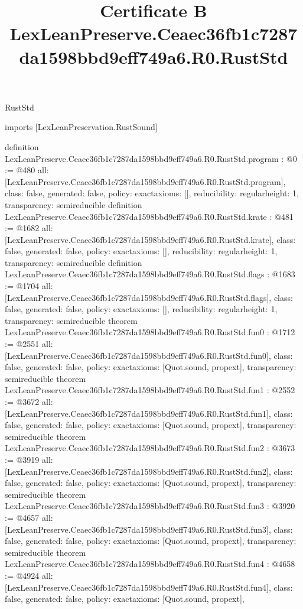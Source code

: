 \begin{lexlean}{RustStd}
\title{Certificate B LexLeanPreserve.Ceaec36fb1c7287da1598bbd9eff749a6.R0.RustStd}
\begin{coremodule}
imports [LexLeanPreservation.RustSound]

definition LexLeanPreserve.Ceaec36fb1c7287da1598bbd9eff749a6.R0.RustStd.program : @0 := @480 {
  all: [LexLeanPreserve.Ceaec36fb1c7287da1598bbd9eff749a6.R0.RustStd.program],
  class: false,
  generated: false,
  policy: exact{axioms: []},
  reducibility: regular{height: 1},
  transparency: semireducible
}
definition LexLeanPreserve.Ceaec36fb1c7287da1598bbd9eff749a6.R0.RustStd.krate : @481 := @1682 {
  all: [LexLeanPreserve.Ceaec36fb1c7287da1598bbd9eff749a6.R0.RustStd.krate],
  class: false,
  generated: false,
  policy: exact{axioms: []},
  reducibility: regular{height: 1},
  transparency: semireducible
}
definition LexLeanPreserve.Ceaec36fb1c7287da1598bbd9eff749a6.R0.RustStd.flags : @1683 := @1704 {
  all: [LexLeanPreserve.Ceaec36fb1c7287da1598bbd9eff749a6.R0.RustStd.flags],
  class: false,
  generated: false,
  policy: exact{axioms: []},
  reducibility: regular{height: 1},
  transparency: semireducible
}
theorem LexLeanPreserve.Ceaec36fb1c7287da1598bbd9eff749a6.R0.RustStd.fun0 : @1712 := @2551 {
  all: [LexLeanPreserve.Ceaec36fb1c7287da1598bbd9eff749a6.R0.RustStd.fun0],
  class: false,
  generated: false,
  policy: exact{axioms: [Quot.sound, propext]},
  transparency: semireducible
}
theorem LexLeanPreserve.Ceaec36fb1c7287da1598bbd9eff749a6.R0.RustStd.fun1 : @2552 := @3672 {
  all: [LexLeanPreserve.Ceaec36fb1c7287da1598bbd9eff749a6.R0.RustStd.fun1],
  class: false,
  generated: false,
  policy: exact{axioms: [Quot.sound, propext]},
  transparency: semireducible
}
theorem LexLeanPreserve.Ceaec36fb1c7287da1598bbd9eff749a6.R0.RustStd.fun2 : @3673 := @3919 {
  all: [LexLeanPreserve.Ceaec36fb1c7287da1598bbd9eff749a6.R0.RustStd.fun2],
  class: false,
  generated: false,
  policy: exact{axioms: [Quot.sound, propext]},
  transparency: semireducible
}
theorem LexLeanPreserve.Ceaec36fb1c7287da1598bbd9eff749a6.R0.RustStd.fun3 : @3920 := @4657 {
  all: [LexLeanPreserve.Ceaec36fb1c7287da1598bbd9eff749a6.R0.RustStd.fun3],
  class: false,
  generated: false,
  policy: exact{axioms: [Quot.sound, propext]},
  transparency: semireducible
}
theorem LexLeanPreserve.Ceaec36fb1c7287da1598bbd9eff749a6.R0.RustStd.fun4 : @4658 := @4924 {
  all: [LexLeanPreserve.Ceaec36fb1c7287da1598bbd9eff749a6.R0.RustStd.fun4],
  class: false,
  generated: false,
  policy: exact{axioms: [Quot.sound, propext]},
}
\end{coremodule}
\end{lexlean}
